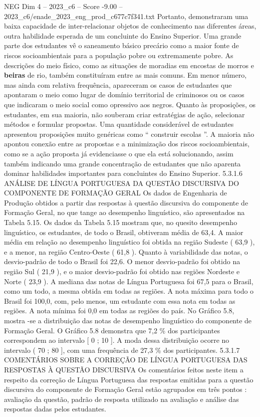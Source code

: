 \begin{textsample}{NEG Dim 4 – 2023\_c6 – Score -9.00 – 2023\_c6/enade\_2023\_eng\_prod\_c677c7f341.txt}
Portanto, demonstraram uma baixa capacidade de inter-relacionar objetos de conhecimento nas diferentes áreas, outra habilidade esperada de um concluinte do Ensino Superior.
Uma grande parte dos estudantes vê o saneamento básico precário como a maior fonte de riscos socioambientais para a população pobre ou extremamente pobre.
As descrições do meio físico, como as situações de moradias em encostas de morros e \textbf{beiras} de rio, também constituíram entre as mais comuns.
Em menor número, mas ainda com relativa frequência, apareceram os casos de estudantes que apontaram o meio como lugar de domínio territorial de criminosos ou os casos que indicaram o meio social como opressivo aos negros.
Quanto às proposições, os estudantes, em sua maioria, não souberam criar estratégias de ação, selecionar métodos e formular propostas.
Uma quantidade considerável de estudantes apresentou proposições muito genéricas como “ construir escolas ”.
A maioria não apontou conexão entre as propostas e a minimização dos riscos socioambientais, como se a ação proposta já evidenciasse o que ela está solucionando, assim também indicando uma grande concentração de estudantes que não aparenta dominar habilidades importantes para concluintes do Ensino Superior. 5.3.1.6 ANÁLISE DE LÍNGUA PORTUGUESA DA QUESTÃO DISCURSIVA DO COMPONENTE DE FORMAÇÃO GERAL Os dados de Engenharia de Produção obtidos a partir das respostas à questão discursiva do componente de Formação Geral, no que tange ao desempenho linguístico, são apresentados na Tabela 5.15.
Os dados da Tabela 5.15 mostram que, no quesito desempenho linguístico, os estudantes, de todo o Brasil, obtiveram média de 63,4.
A maior média em relação ao desempenho linguístico foi obtida na região Sudeste ( 63,9 ), e a menor, na região Centro-Oeste ( 61,8 ).
Quanto à variabilidade das notas, o desvio-padrão de todo o Brasil foi 22,6.
O menor desvio-padrão foi obtido na região Sul ( 21,9 ), e o maior desvio-padrão foi obtido nas regiões Nordeste e Norte ( 23,9 ).
A mediana das notas de Língua Portuguesa foi 67,5 para o Brasil, como um todo, a mesma obtida em todas as regiões.
A nota máxima para todo o Brasil foi 100,0, com, pelo menos, um estudante com essa nota em todas as regiões.
A nota mínima foi 0,0 em todas as regiões do país.
No Gráfico 5.8, mostra -se a distribuição das notas de desempenho linguístico do componente de Formação Geral.
O Gráfico 5.8 demonstra que 7,2 \% dos participantes correspondem ao intervalo [ 0 ; 10 ].
A moda dessa distribuição ocorre no intervalo ( 70 ; 80 ], com uma frequência de 27,3 \% dos participantes. 5.3.1.7 COMENTÁRIOS SOBRE A CORREÇÃO DE LÍNGUA PORTUGUESA DAS RESPOSTAS À QUESTÃO DISCURSIVA Os comentários feitos neste item a respeito da correção de Língua Portuguesa das respostas emitidas para a questão discursiva do componente de Formação Geral estão agrupados em três pontos : avaliação da questão, padrão de resposta utilizado na avaliação e análise das respostas dadas pelos estudantes.

\end{textsample}
